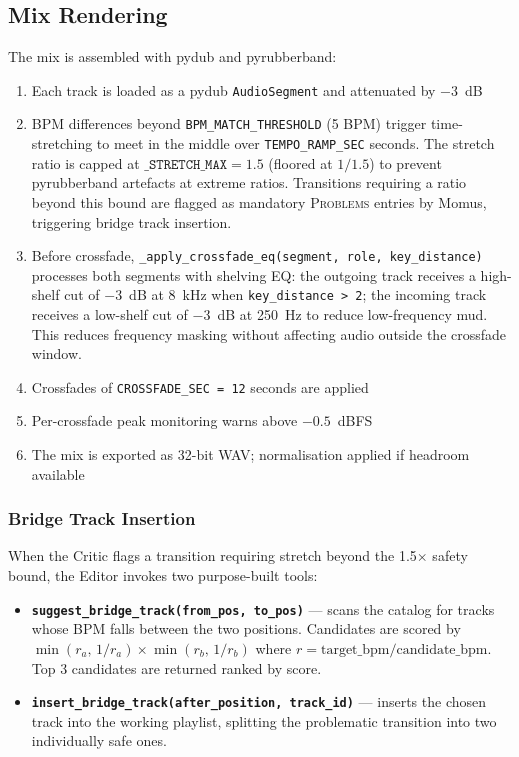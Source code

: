 \documentclass[11pt,a4paper]{article}
\begin{document}
\subsection{Mix Rendering}

The mix is assembled with pydub and pyrubberband:

\begin{enumerate}
  \item Each track is loaded as a pydub \texttt{AudioSegment} and attenuated
        by $-3$~dB
  \item BPM differences beyond \texttt{BPM\_MATCH\_THRESHOLD} (5 BPM) trigger
        time-stretching to meet in the middle over \texttt{TEMPO\_RAMP\_SEC}
        seconds. The stretch ratio is capped at $\texttt{\_STRETCH\_MAX} = 1.5$
        (floored at $1/1.5$) to prevent pyrubberband artefacts at extreme ratios.
        Transitions requiring a ratio beyond this bound are flagged as mandatory
        \textsc{Problems} entries by Momus, triggering bridge track insertion.
  \item Before crossfade, \texttt{\_apply\_crossfade\_eq(segment, role, key\_distance)}
        processes both segments with shelving EQ: the outgoing track receives a
        high-shelf cut of $-3$~dB at 8~kHz when \texttt{key\_distance > 2};
        the incoming track receives a low-shelf cut of $-3$~dB at 250~Hz to
        reduce low-frequency mud. This reduces frequency masking without
        affecting audio outside the crossfade window.
  \item Crossfades of \texttt{CROSSFADE\_SEC = 12} seconds are applied
  \item Per-crossfade peak monitoring warns above $-0.5$~dBFS
  \item The mix is exported as 32-bit WAV; normalisation applied if headroom available
\end{enumerate}

\subsubsection{Bridge Track Insertion}

When the Critic flags a transition requiring stretch beyond the 1.5$\times$
safety bound, the Editor invokes two purpose-built tools:

\begin{itemize}
  \item \textbf{\texttt{suggest\_bridge\_track(from\_pos, to\_pos)}} ---
        scans the catalog for tracks whose BPM falls between the two positions.
        Candidates are scored by
        $\min(r_a,\,1/r_a)\times\min(r_b,\,1/r_b)$
        where $r = \text{target\_bpm}/\text{candidate\_bpm}$.
        Top 3 candidates are returned ranked by score.
  \item \textbf{\texttt{insert\_bridge\_track(after\_position, track\_id)}} ---
        inserts the chosen track into the working playlist, splitting the
        problematic transition into two individually safe ones.
\end{itemize}
\end{document}
